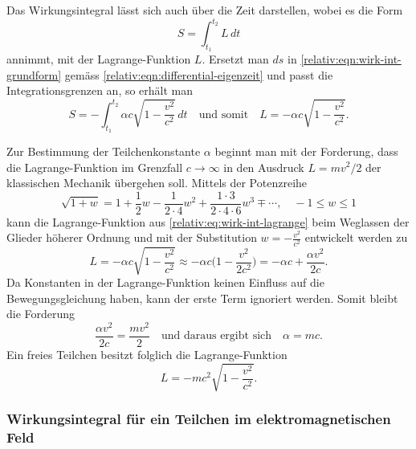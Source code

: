 Das Wirkungsintegral lässt sich auch über die Zeit darstellen,
wobei es die Form
\begin{equation}
    S = \int_{t_1}^{t_2} L \, dt
\label{relativ:eqn:wirk-int-zeit}
\end{equation}
annimmt, mit der Lagrange-Funktion \(L\).
Ersetzt man \(ds\) in \eqref{relativ:eqn:wirk-int-grundform}
gemäss \eqref{relativ:eqn:differential-eigenzeit} und passt
die Integrationsgrenzen an, so erhält man
\begin{equation}
    S = -\int_{t_1}^{t_2} \alpha c \sqrt{1-\frac{v^2}{c^2}}\, dt
    \quad \text{und somit} \quad
    L = -\alpha c \sqrt{1-\frac{v^2}{c^2}}.
    \label{relativ:eq:wirk-int-lagrange}
\end{equation}

Zur Bestimmung der Teilchenkonstante \(\alpha\) beginnt man mit der Forderung,
dass die Lagrange-Funktion im Grenzfall \(c\rightarrow\infty\) in den
Ausdruck \(L=mv^2/2\) der klassischen Mechanik übergehen soll.
Mittels der Potenzreihe
\begin{equation*}
    \sqrt{1+w} = 1 + \frac{1}{2} w - \frac{1}{2\cdot4} w^2 +
    \frac{1\cdot3}{2\cdot4\cdot6} w^3 \mp \cdots, \quad
    -1\leq w \leq1
\end{equation*}
kann die Lagrange-Funktion aus
\eqref{relativ:eq:wirk-int-lagrange} beim Weglassen der
Glieder höherer Ordnung und mit der Substitution
\(w=-\frac{v^2}{c^2}\) entwickelt werden zu
\begin{equation}
    L = - \alpha c \sqrt{1-\frac{v^2}{c^2}}
    \approx -\alpha c \biggl(1 - \frac{v^2}{2c^2}\biggr)
    = -\alpha c + \frac{\alpha v^2}{2c}.
\end{equation}
Da Konstanten in der Lagrange-Funktion keinen Einfluss auf die Bewegungsgleichung haben,
kann der erste Term ignoriert werden. Somit bleibt die Forderung
\begin{equation}
    \frac{\alpha v^2}{2c} = \frac{mv^2}{2}
    \quad \text{und daraus ergibt sich} \quad
    \alpha = mc.
\end{equation}
Ein freies Teilchen besitzt folglich die Lagrange-Funktion
\begin{equation}
    L = -mc^2 \sqrt{1-\frac{v^2}{c^2}}.
\label{relativ:eqn:lagrange-freies-teilchen}
\end{equation}

\subsubsection{Wirkungsintegral für ein Teilchen im elektromagnetischen Feld
\label{relativ:section:wirk-int-em-feld}}


